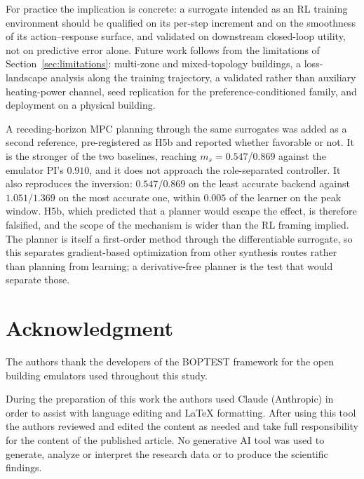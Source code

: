 \documentclass{ieeeaccess}
\newcommand{\ms}{\ensuremath{m_s}}
\begin{document}
For practice the implication is concrete: a surrogate intended as an RL training
environment should be qualified on its per-step increment and on the smoothness
of its action--response surface, and validated on downstream closed-loop
utility, not on predictive error alone. Future work follows from the limitations
of Section~\ref{sec:limitations}: multi-zone and mixed-topology buildings, a
loss-landscape analysis along the training trajectory, a validated rather than
auxiliary heating-power channel, seed replication for the
preference-conditioned family, and deployment on a physical building.

A receding-horizon MPC planning through the same surrogates was added as a
second reference, pre-registered as H5b and reported whether favorable or not.
It is the stronger of the two baselines, reaching $\ms=0.547$/$0.869$ against the
emulator PI's $0.910$, and it does not approach the role-separated controller.
It also reproduces the inversion: $0.547$/$0.869$ on the least accurate backend
against $1.051$/$1.369$ on the most accurate one, within $0.005$ of the learner
on the peak window. H5b, which predicted that a planner would escape the effect,
is therefore falsified, and the scope of the mechanism is wider than the RL
framing implied. The planner is itself a first-order method through the
differentiable surrogate, so this separates gradient-based optimization from
other synthesis routes rather than planning from learning; a derivative-free
planner is the test that would separate those.

\section*{Acknowledgment}

The authors thank the developers of the BOPTEST framework for the open building
emulators used throughout this study.

During the preparation of this work the authors used Claude (Anthropic) in order
to assist with language editing and \LaTeX{} formatting. After using this tool
the authors reviewed and edited the content as needed and take full
responsibility for the content of the published article. No generative AI tool
was used to generate, analyze or interpret the research data or to produce the
scientific findings.






\EOD
\end{document}
